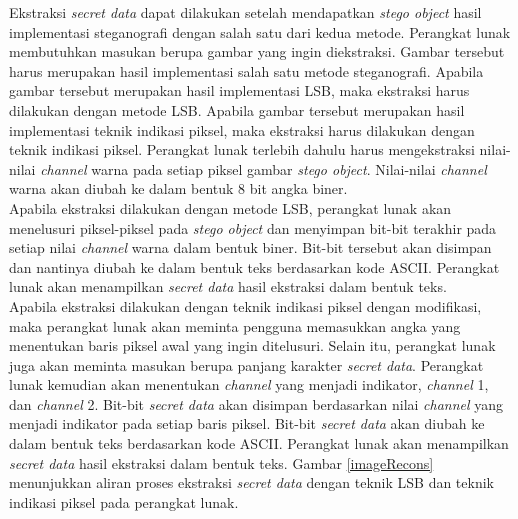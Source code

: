 \documentclass[a4paper,twoside]{article}
\begin{document}
\begin{enumerate}
		Ekstraksi \textit{secret data} dapat dilakukan setelah mendapatkan \textit{stego object} hasil implementasi steganografi dengan salah satu dari kedua metode. Perangkat lunak membutuhkan masukan berupa gambar yang ingin diekstraksi. Gambar tersebut harus merupakan hasil implementasi salah satu metode steganografi. Apabila gambar tersebut merupakan hasil implementasi LSB, maka ekstraksi harus dilakukan dengan metode LSB. Apabila gambar tersebut merupakan hasil implementasi teknik indikasi piksel, maka ekstraksi harus dilakukan dengan teknik indikasi piksel. Perangkat lunak terlebih dahulu harus mengekstraksi nilai-nilai \textit{channel} warna pada setiap piksel gambar \textit{stego object}. Nilai-nilai \textit{channel} warna akan diubah ke dalam bentuk  8 bit angka biner.\\
		
		Apabila ekstraksi dilakukan dengan metode LSB, perangkat lunak akan menelusuri piksel-piksel pada \textit{stego object} dan menyimpan bit-bit terakhir pada setiap nilai \textit{channel} warna dalam bentuk biner. Bit-bit tersebut akan disimpan dan nantinya diubah ke dalam bentuk teks berdasarkan kode ASCII. Perangkat lunak akan menampilkan \textit{secret data} hasil ekstraksi dalam bentuk teks.\\
		
		Apabila ekstraksi dilakukan dengan teknik indikasi piksel dengan modifikasi, maka perangkat lunak akan meminta pengguna memasukkan angka yang menentukan baris piksel awal yang ingin ditelusuri. Selain itu, perangkat lunak juga akan meminta masukan berupa panjang karakter \textit{secret data}. Perangkat lunak kemudian akan menentukan \textit{channel} yang menjadi indikator, \textit{channel} 1, dan \textit{channel} 2. Bit-bit \textit{secret data} akan disimpan berdasarkan nilai \textit{channel} yang menjadi indikator pada setiap baris piksel. Bit-bit \textit{secret data} akan diubah ke dalam bentuk teks berdasarkan kode ASCII. Perangkat lunak akan menampilkan \textit{secret data} hasil ekstraksi dalam bentuk teks. Gambar \ref{imageRecons} menunjukkan aliran proses ekstraksi \textit{secret data} dengan teknik LSB dan teknik indikasi piksel pada perangkat lunak.\\
		

\end{enumerate}
\end{document}
